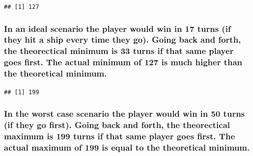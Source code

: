 \documentclass[
]{article}
\newenvironment{Shaded}{\begin{snugshade}}{\end{snugshade}}
\newcommand{\CommentTok}[1]{\textcolor[rgb]{0.56,0.35,0.01}{\textit{#1}}}
\newcommand{\ControlFlowTok}[1]{\textcolor[rgb]{0.13,0.29,0.53}{\textbf{#1}}}
\newcommand{\DecValTok}[1]{\textcolor[rgb]{0.00,0.00,0.81}{#1}}
\newcommand{\FunctionTok}[1]{\textcolor[rgb]{0.13,0.29,0.53}{\textbf{#1}}}
\newcommand{\NormalTok}[1]{#1}
\newcommand{\SpecialCharTok}[1]{\textcolor[rgb]{0.81,0.36,0.00}{\textbf{#1}}}
\begin{document}
\begin{Shaded}
\end{Shaded}

\begin{verbatim}
## [1] 127
\end{verbatim}

\subsubsection{In an ideal scenario the player would win in 17 turns (if
they hit a ship every time they go). Going back and forth, the
theorectical minimum is 33 turns if that same player goes first. The
actual minimum of 127 is much higher than the theoretical
minimum.}\label{in-an-ideal-scenario-the-player-would-win-in-17-turns-if-they-hit-a-ship-every-time-they-go.-going-back-and-forth-the-theorectical-minimum-is-33-turns-if-that-same-player-goes-first.-the-actual-minimum-of-127-is-much-higher-than-the-theoretical-minimum.}

\begin{Shaded}
\end{Shaded}

\begin{verbatim}
## [1] 199
\end{verbatim}

\subsubsection{In the worst case scenario the player would win in 50
turns (if they go first). Going back and forth, the theorectical maximum
is 199 turns if that same player goes first. The actual maximum of 199
is equal to the theoretical
minimum.}\label{in-the-worst-case-scenario-the-player-would-win-in-50-turns-if-they-go-first.-going-back-and-forth-the-theorectical-maximum-is-199-turns-if-that-same-player-goes-first.-the-actual-maximum-of-199-is-equal-to-the-theoretical-minimum.}
\end{document}
